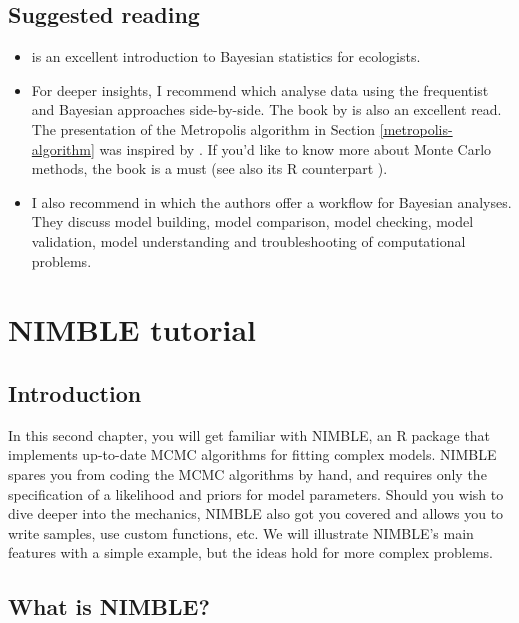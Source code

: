 \documentclass[
  12pt,
]{krantz}
\begin{document}
\section{Suggested reading}\label{suggested-reading}

\begin{itemize}
\item
  \citet{mccarthy2007} is an excellent introduction to Bayesian statistics for ecologists.
\item
  For deeper insights, I recommend \citet{gelmanhill2006} which analyse data using the frequentist and Bayesian approaches side-by-side. The book by \citet{mcelreathbook} is also an excellent read. The presentation of the Metropolis algorithm in Section \ref{metropolis-algorithm} was inspired by \citet{alberthu2019}. If you'd like to know more about Monte Carlo methods, the book \citet{robert2004montecarlo} is a must (see also its R counterpart \citet{robert2004montecarloinr}).
\item
  I also recommend \citet{gelman2020workflow} in which the authors offer a workflow for Bayesian analyses. They discuss model building, model comparison, model checking, model validation, model understanding and troubleshooting of computational problems.
\end{itemize}

\chapter{NIMBLE tutorial}\label{intronimble}

\section{Introduction}\label{introduction-2}

In this second chapter, you will get familiar with NIMBLE, an R package that implements up-to-date MCMC algorithms for fitting complex models. NIMBLE spares you from coding the MCMC algorithms by hand, and requires only the specification of a likelihood and priors for model parameters. Should you wish to dive deeper into the mechanics, NIMBLE also got you covered and allows you to write samples, use custom functions, etc. We will illustrate NIMBLE's main features with a simple example, but the ideas hold for more complex problems.

\section{What is NIMBLE?}\label{what-is-nimble}
\end{document}

